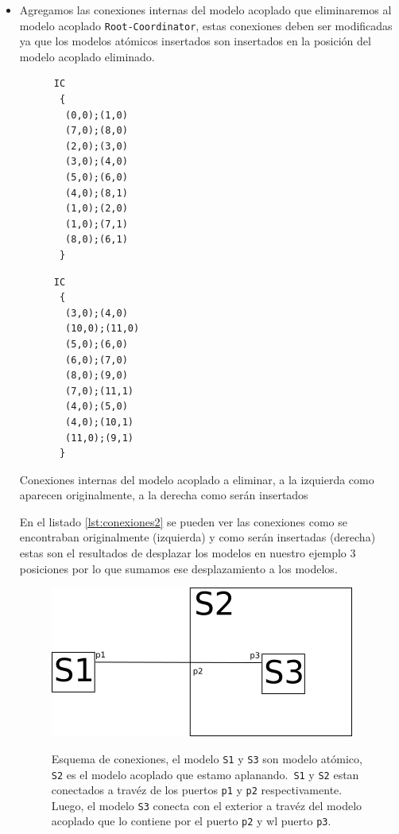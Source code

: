 \begin{itemize}
        \item Agregamos las conexiones internas del modelo acoplado que eliminaremos al modelo acoplado \texttt{Root-Coordinator}, estas conexiones deben ser 
        modificadas ya que los modelos atómicos insertados son insertados en la posición del modelo acoplado eliminado.

\begin{listing}
\begin{minipage}[t]{0.5\textwidth}
\begin{verbatim}
      IC
       {
        (0,0);(1,0)
        (7,0);(8,0)
        (2,0);(3,0)
        (3,0);(4,0)
        (5,0);(6,0)
        (4,0);(8,1)
        (1,0);(2,0)
        (1,0);(7,1)
        (8,0);(6,1)
       }
\end{verbatim}
        \end{minipage}
        \begin{minipage}[t]{0.5\textwidth}
\begin{verbatim}
      IC
       {
        (3,0);(4,0)
        (10,0);(11,0)
        (5,0);(6,0)
        (6,0);(7,0)
        (8,0);(9,0)
        (7,0);(11,1)
        (4,0);(5,0)
        (4,0);(10,1)
        (11,0);(9,1)
       }
\end{verbatim}
        \end{minipage}
        \label{lst:conexiones2}
        \caption{Conexiones internas del modelo acoplado a eliminar, a la izquierda como aparecen originalmente, a la derecha como serán insertados}
\end{listing}

        En el listado \ref{lst:conexiones2} se pueden ver las conexiones como se encontraban originalmente (izquierda) y como serán insertadas (derecha)
        estas son el resultados de desplazar los modelos en nuestro ejemplo $3$ posiciones por lo que sumamos ese desplazamiento a los modelos.

\begin{figure}[!htbp]
\centering
\includegraphics[width=.75\textwidth]{text3418}
\label{fig:aplanado-ports}
\caption{Esquema de conexiones, el modelo \texttt{S1} y \texttt{S3} son modelo atómico, \texttt{S2} es el modelo acoplado que estamo aplanando.\
	\texttt{S1} y \texttt{S2} estan conectados a travéz de los puertos \texttt{p1} y \texttt{p2} respectivamente. Luego, el modelo \texttt{S3} conecta con
	el exterior a travéz del modelo acoplado que lo contiene por el puerto \texttt{p2} y wl puerto  \texttt{p3}.
	}
\end{figure}


\end{itemize}
